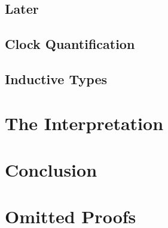 \documentclass[a4paper,UKenglish,cleveref, autoref,numberwithinsect]{lipics-v2019}
\begin{document}
\subsection{Later}




\subsection{Clock Quantification}



\subsection{Inductive Types}


\section{The Interpretation}


\section{Conclusion}

\appendix
\section{Omitted Proofs}





\end{document}
